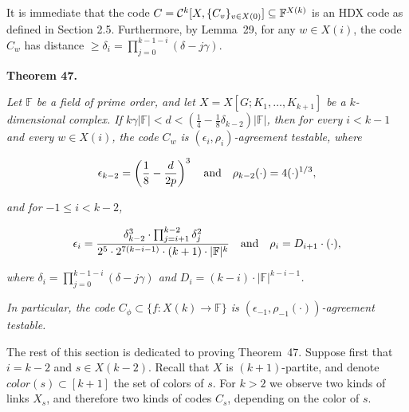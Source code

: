 \documentclass[10pt,a4paper]{article}
\begin{document}
It is immediate that the code $C={\cal C}^{k}[X,\{C_{v}\}_{v\in X(0)}]\subseteq\mathbb{F}^{X(k)}$ is an HDX code as defined in Section 2.5. Furthermore, by Lemma 29, for any $w\in X(i)$, the code $C_{w}$ has distance $\geq\delta_{i}=\prod_{j=0}^{k-1-i}(\delta-j\gamma)$.\par





\par\medskip\noindent\textbf{
\textbf{Theorem 47}\textbf{.}
}\par



\emph{Let $\mathbb{F}$ be a field of prime order, and let $X=X[G;K_{1},\dots,K_{k+1}]$ be a $k$-dimensional complex. If $k\gamma|\mathbb{F}|<d<\left(\frac{1}{4}-\frac{1}{8}\delta_{k-2}\right)|\mathbb{F}|$,  then for every $i<k-1$ and every $w\in X(i)$, the code $C_{w}$ is $(\epsilon_{i},\rho_{i})$-agreement testable, where}\par


\[\begin{gathered}
\epsilon_{k-2}=\left(\frac{1}{8}-\frac{d}{2p}\right)^{3}\nobreak\ \nobreak\ \nobreak\ \text{and}\nobreak\ \nobreak\ \nobreak\ \rho_{k-2}(\cdot)=4(\cdot)^{1/3},
\end{gathered}\]


\emph{and for $-1\leq i<k-2$,}\par


\[\begin{gathered}
\epsilon_{i}=\frac{\delta_{k-2}^{3}\cdot\prod_{j=i+1}^{k-2}\delta_{j}^{2}}{2^{5}\cdot 2^{7(k-i-1)}\cdot(k+1)\cdot|\mathbb{F}|^{k}}\nobreak\ \nobreak\ \nobreak\ \text{and}\nobreak\ \nobreak\ \nobreak\ \rho_{i}=D_{i+1}\cdot(\cdot),
\end{gathered}\]


\emph{where $\delta_{i}=\prod_{j=0}^{k-1-i}(\delta-j\gamma)$ and $D_{i}=(k-i)\cdot|\mathbb{F}|^{k-i-1}$.}\par




\emph{In particular, the code $C_{\phi}\subset\{f:X(k)\to\mathbb{F}\}$ is $(\epsilon_{-1},\rho_{-1}(\cdot))$-agreement testable.}\par






The rest of this section is dedicated to proving Theorem 47. Suppose first that $i=k-2$ and $s\in X(k-2)$. Recall that $X$ is $(k+1)$-partite, and denote $color(s)\subset[k+1]$ the set of colors of $s$. For $k>2$ we observe two kinds of links $X_{s}$, and therefore two kinds of codes $C_{s}$, depending on the color of $s$.\par
\end{document}
